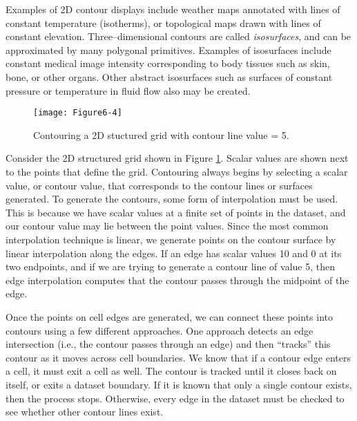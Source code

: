 Examples of 2D contour displays include weather maps annotated with lines of constant temperature (isotherms), or topological maps drawn with lines of constant elevation. Three--dimensional contours are called \emph{isosurfaces}, and can be approximated by many polygonal primitives. Examples of isosurfaces include constant medical image intensity corresponding to body tissues such as skin, bone, or other organs. Other abstract isosurfaces such as surfaces of constant pressure or temperature in fluid flow also may be created.


\begin{figure}[!htb]
	\centering
	\texttt{[image: Figure6-4]}
	\caption{ Contouring a 2D stuctured grid with contour line value = 5.}
	\label{fig:Figure6-4}
\end{figure}

Consider the 2D structured grid shown in Figure \ref{fig:Figure6-4}. Scalar values are shown next to the points that define the grid. Contouring always begins by selecting a scalar value, or contour value, that corresponds to the contour lines or surfaces generated. To generate the contours, some form of interpolation must be used. This is because we have scalar values at a finite set of points in the dataset, and our contour value may lie between the point values. Since the most common interpolation technique is linear, we generate points on the contour surface by linear interpolation along the edges. If an edge has scalar values 10 and 0 at its two endpoints, and if we are trying to generate a contour line of value 5, then edge interpolation computes that the contour passes through the midpoint of the edge.

Once the points on cell edges are generated, we can connect these points into contours using a few different approaches. One approach detects an edge intersection (i.e., the contour passes through an edge) and then ``tracks'' this contour as it moves across cell boundaries. We know that if a contour edge enters a cell, it must exit a cell as well. The contour is tracked until it closes back on itself, or exits a dataset boundary. If it is known that only a single contour exists, then the process stops. Otherwise, every edge in the dataset must be checked to see whether other contour lines exist.

